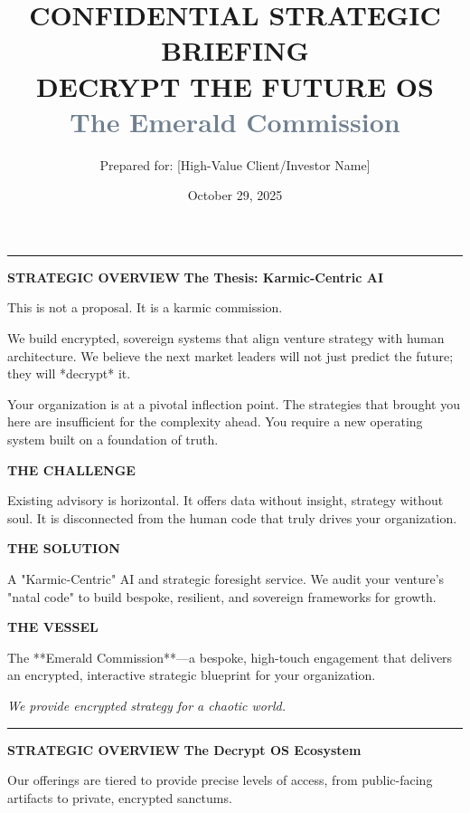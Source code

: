 \documentclass[11pt, a4paper]{article}
\title{
    \vspace{-1cm}
    \fontsize{10}{12}\selectfont
    \textcolor{Emerald}{CONFIDENTIAL STRATEGIC BRIEFING} \\
    \vspace{0.5cm}
    \fontsize{36}{40}\selectfont
    \textbf{DECRYPT THE FUTURE OS} \\
    \vspace{0.25cm}
    \fontsize{20}{24}\selectfont
    \textcolor{SlateGrey}{The Emerald Commission}
}
\author{Prepared for: [High-Value Client/Investor Name]}
\date{October 29, 2025}
\newcommand{\decksection}[1]{
    \par
    \vspace{0.7cm}
    \textcolor{Emerald}{\rule{\linewidth}{1pt}}
    \vspace{0.2cm}
    \noindent\textcolor{Emerald}{\fontsize{10}{12}\selectfont\textbf{STRATEGIC OVERVIEW}}
    \noindent\fontsize{24}{28}\selectfont\textbf{#1}
    \vspace{0.5cm}
}
\newcommand{\keyinsight}[2]{
    \par
    \vspace{0.3cm}
    \noindent
    \begin{minipage}{0.15\linewidth}
        \fontsize{18}{20}\selectfont\textcolor{Emerald}{\textbf{#1}}
    \end{minipage}
    \begin{minipage}{0.8\linewidth}
        \fontsize{11}{14}\selectfont #2
    \end{minipage}
    \vspace{0.3cm}
}
\begin{document}
\maketitle
\thispagestyle{empty}

\newpage

\decksection{The Thesis: Karmic-Centric AI}

This is not a proposal. It is a karmic commission.

We build encrypted, sovereign systems that align venture strategy with human architecture. We believe the next market leaders will not just predict the future; they will *decrypt* it.

Your organization is at a pivotal inflection point. The strategies that brought you here are insufficient for the complexity ahead. You require a new operating system built on a foundation of truth.

\keyinsight{THE CHALLENGE}
{Existing advisory is horizontal. It offers data without insight, strategy without soul. It is disconnected from the human code that truly drives your organization.}

\keyinsight{THE SOLUTION}
{A "Karmic-Centric" AI and strategic foresight service. We audit your venture's "natal code" to build bespoke, resilient, and sovereign frameworks for growth.}

\keyinsight{THE VESSEL}
{The **Emerald Commission**—a bespoke, high-touch engagement that delivers an encrypted, interactive strategic blueprint for your organization.}

\vspace{0.5cm}
\centerline{\textit{We provide encrypted strategy for a chaotic world.}}

\newpage

\decksection{The Decrypt OS Ecosystem}
Our offerings are tiered to provide precise levels of access, from public-facing artifacts to private, encrypted sanctums.
\end{document}
